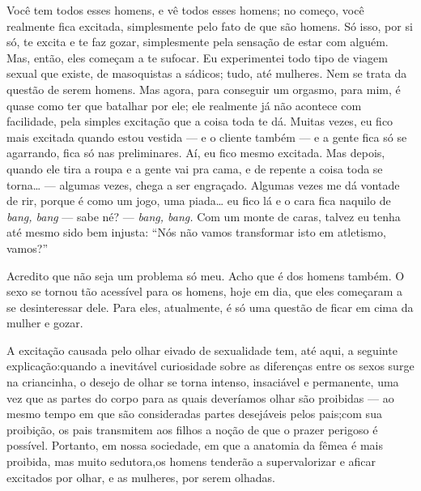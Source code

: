 Você tem todos esses homens, e vê todos esses homens; no começo,
você realmente fica excitada, simplesmente pelo fato de que são homens.
Só isso, por si só, te excita e te faz gozar, simplesmente pela
sensação de estar com alguém. Mas, então, eles começam a te sufocar. Eu
experimentei todo tipo de viagem sexual que existe, de masoquistas a
sádicos; tudo, até mulheres. Nem se trata da questão de serem homens.
Mas agora, para conseguir um orgasmo, para mim, é quase como ter que
batalhar por ele; ele realmente já não acontece com facilidade, pela
simples excitação que a coisa toda te dá. Muitas vezes, eu fico mais
excitada quando estou vestida --- e o cliente também --- e a gente
fica só se agarrando, fica só nas preliminares. Aí, eu fico mesmo
excitada. Mas depois, quando ele tira a roupa e a gente vai pra cama, e
de repente a coisa toda se torna\ldots{} --- algumas vezes, chega a ser
engraçado. Algumas vezes me dá vontade de rir, porque é como um jogo,
uma piada\ldots{} eu fico lá e o cara fica naquilo de \textit{bang, bang}
--- sabe né? --- \textit{bang, bang.} Com um monte de caras, talvez
eu tenha até mesmo sido bem injusta: ``Nós não vamos
transformar isto em atletismo, vamos?''

Acredito que não seja um problema só meu. Acho que é dos homens
também. O sexo se tornou tão acessível para os homens, hoje em dia, que
eles começaram a se desinteressar dele. Para eles, atualmente, é só
uma questão de ficar em cima da mulher e gozar.


A excitação causada pelo olhar\idxmistolh{} eivado de sexualidade\idxinfanolhar{} tem,\idxsexuo{} até aqui,
a seguinte explicação:\idxsadivoye[|(] quando a inevitável curiosidade sobre as
diferenças entre os sexos surge na criancinha,\idxvoyrai{} o desejo de olhar se
torna intenso, insaciável e permanente, uma vez que as partes do corpo
para as quais deveríamos olhar são proibidas --- ao mesmo tempo em que
são consideradas partes desejáveis pelos pais;\idxvoysad[|(] com sua proibição, os
pais transmitem aos filhos a noção de que o prazer perigoso é possível.
Portanto, em nossa sociedade, em que a anatomia da fêmea é mais
proibida, mas muito sedutora,\idxpervenfad[|)] os homens tenderão a supervalorizar e a\idxprostenf[|)]
ficar excitados por olhar, e as mulheres, por serem olhadas.

